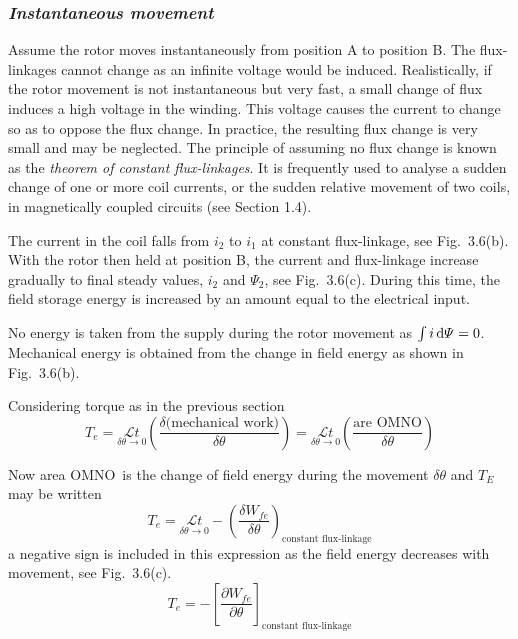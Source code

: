 \documentclass[a4paper,numbers=noenddot,12pt]{scrbook}
\begin{document}
\subsubsection{\textit{Instantaneous movement}}
Assume the rotor moves instantaneously from position A to position B. The flux-linkages cannot change as an infinite voltage would be induced. Realistically, if the rotor movement is not instantaneous but very fast, a small change of flux induces a high voltage in the winding. This voltage causes the current to change so as to oppose the flux change. In practice, the resulting flux change is very small and may be neglected. The principle of
assuming no flux change is known as the \textit{theorem of constant flux-linkages}. It is frequently used to analyse a sudden change of one or more coil currents, or the sudden relative movement of two coils, in magnetically coupled circuits (see Section 1.4). 

The current in the coil falls from $i_2$ to $i_1$ at constant flux-linkage, see Fig.\ 3.6(b). With the rotor then held at position B, the current and flux-linkage increase gradually to final steady values, $i_2$ and $\varPsi_2$, see Fig.\ 3.6(c). During this time, the field storage energy is increased by an amount equal to the electrical input.

No energy is taken from the supply during the rotor movement as $\int i \dif \varPsi = 0$. Mechanical energy is obtained from the change in field energy as shown in Fig.\ 3.6(b).

Considering torque as in the previous section 
\begin{equation}
    T_e = \underset{\delta \theta \to 0}{\mathcal{L} t} \left(\dfrac{\delta \text{(mechanical work)}}{\delta \theta}\right) = \underset{\delta \theta \to 0}{\mathcal{L} t} \left(\dfrac{\text{are OMNO}}{\delta \theta}\right)
    \label{eq:Eq3.21}
\end{equation}

Now area OMNO\ is the change of field energy during the movement $\delta \theta$ and $T_E$ may be written 
\begin{equation}
    T_e = \underset{\delta \theta \to 0}{\mathcal{L} t} - {\left( \dfrac{\delta W_{fe}}{\delta \theta}\right)}_{\text{constant flux-linkage}}
    \label{eq:Ee3.22}
\end{equation}
a negative sign is included in this expression as the field energy decreases with movement, see Fig.\ 3.6(c). 
\begin{equation}
    T_e = - {\left[ \dfrac{\partial W_{fe}}{\partial \theta}\right]}_{\text{constant flux-linkage}}
    \label{eq_Eq3.23}
\end{equation}
\end{document}

